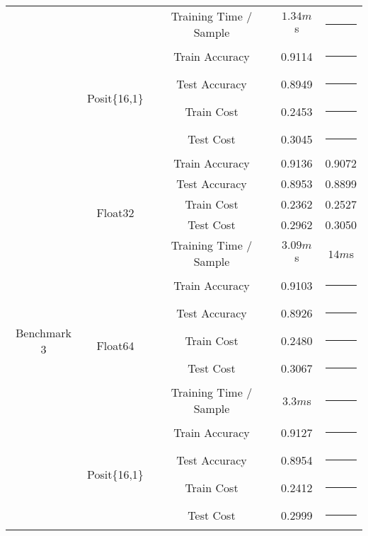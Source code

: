 \begin{table}[!ht]
\begin{tabular}{|c | c | c || c | c |}
		& & Training Time / Sample & $1.34m$s & \rule{5em}{1pt} \\\cline{2-5}
		& \multirow{4}{*}{Posit\{16,1\}} & Train Accuracy & 0.9114 & \rule{5em}{1pt} \\
		& & Test Accuracy & 0.8949 & \rule{5em}{1pt} \\
		& & Train Cost & 0.2453 & \rule{5em}{1pt} \\
		& & Test Cost & 0.3045 & \rule{5em}{1pt} \\\hline
		\multirow{14}{*}{Benchmark 3\footref{batchnorm}} & \multirow{5}{*}{Float32} & Train Accuracy & 0.9136 & 0.9072\\
		& & Test Accuracy & 0.8953 & 0.8899\\
		& & Train Cost & 0.2362 & 0.2527\\
		& & Test Cost & 0.2962 & 0.3050\\
		& & Training Time / Sample & $3.09m$s & $14m$s\\\cline{2-5}
		& \multirow{5}{*}{Float64} & Train Accuracy & 0.9103 & \rule{5em}{1pt} \\
		& & Test Accuracy & 0.8926 & \rule{5em}{1pt} \\
		& & Train Cost & 0.2480 & \rule{5em}{1pt} \\
		& & Test Cost & 0.3067 & \rule{5em}{1pt} \\
		& & Training Time / Sample & $3.3m$s & \rule{5em}{1pt} \\\cline{2-5}
		& \multirow{4}{*}{Posit\{16,1\}} & Train Accuracy & 0.9127 & \rule{5em}{1pt} \\
		& & Test Accuracy & 0.8954 & \rule{5em}{1pt} \\
		& & Train Cost & 0.2412 & \rule{5em}{1pt} \\
		& & Test Cost & 0.2999 & \rule{5em}{1pt} \\\hline		
	\end{tabular}
\end{table}


